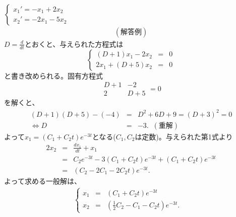 \documentclass[a4paper,11pt,fleqn]{jarticle}
\begin{document}
\newpage
\subsubsection{}
$\left\{ \begin{array}{l}
x_1'=-x_1+2x_2 \\
x_2'=-2x_1-5x_2
\end{array} \right.$
\begin{eqnarray*}
(解答例)
\end{eqnarray*}
$D=\frac d{dt}$とおくと、与えられた方程式は
\[
\left\{
\begin{array}{rcl}
(D+1)x_1-2x_2 &=& 0 \\
2x_1+(D+5)x_2 &=& 0
\end{array}
\right.
\]
と書き改められる。固有方程式
\[
\begin{array}{|cc|}
D+1 & -2 \\
2 & D+5
\end{array}
=0
\]
を解くと、
\begin{eqnarray*}
(D+1)(D+5)-(-4)&=&D^2+6D+9=(D+3)^2=0 \\
\Leftrightarrow D &=& -3. \;\; (重解)
\end{eqnarray*}
よって$x_1=(C_1+C_2t)e^{-3t}$となる($C_1,C_2$は定数)。与えられた第1式より
\begin{eqnarray*}
2x_2 &=& \frac{dx_1}{dt}+x_1 \\
&=& C_2e^{-3t}-3(C_1+C_2t)e^{-3t}+(C_1+C_2t)e^{-3t} \\
&=& (C_2-2C_1-2C_2t)e^{-3t}.
\end{eqnarray*}
よって求める一般解は、
\begin{eqnarray*}
\left\{ \begin{array}{rcl}
x_1&=&(C_1+C_2t)e^{-3t} \\
x_2&=&\left(\frac12C_2-C_1-C_2t\right)e^{-3t}. \ \ \ \ 
\end{array}\right.
\end{eqnarray*}


\newpage
\end{document}
